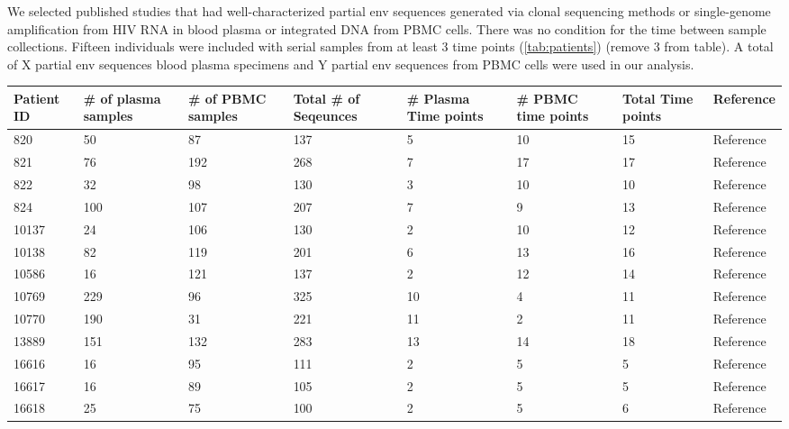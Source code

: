 We selected published studies that had well-characterized partial env sequences generated via clonal sequencing methods or single-genome amplification from HIV RNA in blood plasma or integrated DNA from PBMC cells. There was no condition for the time between sample collections. Fifteen individuals were included with serial samples from at least 3 time points (\ref{tab:patients}) (remove 3 from table). A total of X partial env sequences blood plasma specimens and Y partial env sequences from PBMC cells were used in our analysis.

\begin{table*}[!ht]\label{tab:patients} 
\begin{tabularx}{\textwidth}{| X | X | X | X | X | X | X | l |} 
\hline
Patient ID & \# of plasma samples & \# of PBMC samples & Total \# of Seqeunces & \# Plasma Time points & \# PBMC time points & Total Time points & Reference  \\ \hline
820 &       50 &       87 &      137 &        5 &       10 &       15 & Reference \\
821 &       76 &      192 &      268 &        7 &       17 &       17 & Reference  \\ 
822 &       32 &       98 &      130 &        3 &       10 &       10 & Reference  \\ 
824 &      100 &      107 &      207 &        7 &        9 &       13 & Reference  \\ 
10137 &       24 &      106 &      130 &        2 &       10 &       12 & Reference \\ 
10138 &       82 &      119 &      201 &        6 &       13 &       16 & Reference  \\
10586 &       16 &      121 &      137 &        2 &       12 &       14 & Reference \\ 
10769 &      229 &       96 &      325 &       10 &        4 &       11 & Reference \\ 
10770 &      190 &       31 &      221 &       11 &        2 &       11 & Reference \\ 
13889 &      151 &      132 &      283 &       13 &       14 &       18 & Reference \\ 
16616 &       16 &       95 &      111 &        2 &        5 &        5 & Reference \\ 
16617 &       16 &       89 &      105 &        2 &        5 &        5 & Reference  \\ 
16618 &       25 &       75 &      100 &        2 &        5 &        6 & Reference  \\ 

\end{tabularx}
\end{table*}

